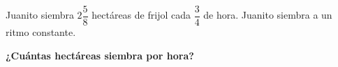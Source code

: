 Juanito siembra $2\dfrac{5}{8}$ hectáreas de frijol cada $\dfrac{3}{4}$ de hora. Juanito siembra a un ritmo constante.

\textbf{¿Cuántas hectáreas siembra por hora?}

\begin{solutionbox}{1.5cm}

\end{solutionbox}